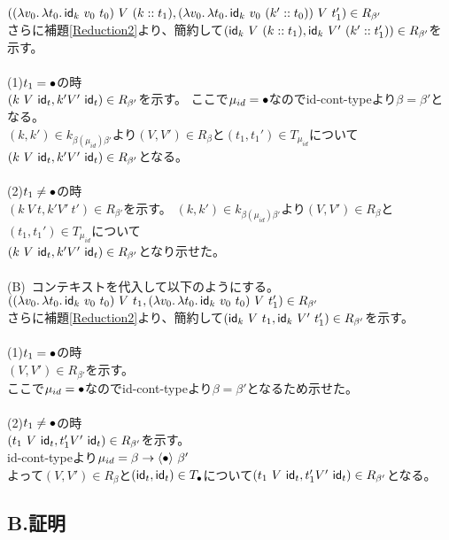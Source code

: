 \documentclass[japanese,draft]{jssst_ppl} %
\begin{document}
$(\LamP{v_0}{\Lam{t_0}{\Idk\ v_0\ t_0}}\ V\ (\Cons{k}{t_1}),
\LamP{v_0}{\Lam{t_0}{\Idk\ v_0\ (\Cons{k'}{t_0})}}\ V\ t_1')\in R_{\beta'}$\\
さらに補題\ref{Reduction2}より、簡約して$(\Idk\ V\ (\Cons{k}{t_1}),\Idk\ V'\ (\Cons{k'}{t_1'}))\in R_{\beta'}$を示す。\\
\\
(1)$t_1=\bullet$の時\\
$(k\ V\ \textsf{id}_t,k' V'\ \textsf{id}_t)\in R_{\beta'}$を示す。
ここで$\mu_{id}=\bullet$なので\textsf{id-cont-type}より$\beta=\beta'$となる。\\
$(k,k')\in k_{\beta(\mu_{id})\beta'}$より$(V,V')\in R_{\beta}$と$(t_1,t_1')\in T_{\mu_{id}}$について\\
$(k\ V\ \textsf{id}_t,k' V'\ \textsf{id}_t)\in R_{\beta'}$となる。\\
\\
(2)$t_1 \neq \bullet$の時\\
$(k\ V\ t,k' V'\ t')\in R_{\beta'}$を示す。
$(k,k')\in k_{\beta(\mu_{id})\beta'}$より$(V,V')\in R_{\beta}$と$(t_1,t_1')\in T_{\mu_{id}}$について\\
$(k\ V\ \textsf{id}_t,k' V'\ \textsf{id}_t)\in R_{\beta'}$となり示せた。\\
\\
(B)\ コンテキストを代入して以下のようにする。\\
$(\LamP{v_0}{\Lam{t_0}{\Idk\ v_0\ t_0}}\ V\ t_1,
\LamP{v_0}{\Lam{t_0}{\Idk\ v_0\ t_0}}\ V\ t_1')\in R_{\beta'}$\\
さらに補題\ref{Reduction2}より、簡約して$(\textsf{id}_k\ V\ t_1,\textsf{id}_k\ V'\ t_1')\in R_{\beta'}$を示す。\\
\\
(1)$t_1=\bullet$の時\\
$(V,V')\in R_{\beta'}$を示す。\\
ここで$\mu_{id}=\bullet$なので\textsf{id-cont-type}より$\beta=\beta'$となるため示せた。\\
\\
(2)$t_1 \neq \bullet$の時\\
$(t_1\ V\ \textsf{id}_t,t_1' V'\ \textsf{id}_t)\in R_{\beta'}$を示す。\\
\textsf{id-cont-type}より$\mu_{id}=\beta \rightarrow \langle\bullet\rangle\ \beta'$\\
よって$(V,V')\in R_{\beta}$と$(\textsf{id}_t,\textsf{id}_t)\in T_{\bullet}$について$(t_1\ V\ \textsf{id}_t,t_1' V'\ \textsf{id}_t)\in R_{\beta'}$となる。

\subsection*{B.証明}
\end{document}
